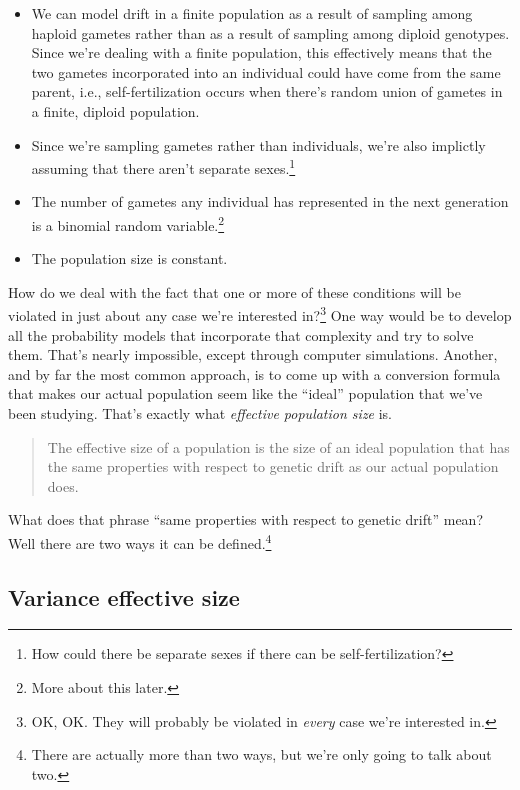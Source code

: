 \begin{itemize}

\item We can model drift in a finite population as a result of
sampling among haploid gametes rather than as a result of sampling
among diploid genotypes. Since we're dealing with a finite population,
this effectively means that the two gametes incorporated into an
individual could have come from the same parent, i.e.,
self-fertilization occurs when there's random union of gametes in a
finite, diploid population.

\item Since we're sampling gametes rather than individuals, we're also
  implictly assuming that there aren't separate sexes.\footnote{How
    could there be separate sexes if there can be self-fertilization?}

\item The number of gametes any individual has represented in the next
  generation is a binomial random variable.\footnote{More about this
    later.}

\item The population size is constant.

\end{itemize}

How do we deal with the fact that one or more of these conditions will
be violated in just about any case we're interested in?\footnote{OK,
  OK. They will probably be violated in {\it every\/} case we're
  interested in.} One way would be to develop all the probability
models that incorporate that complexity and try to solve them. That's
nearly impossible, except through computer simulations. Another, and
by far the most common approach, is to come up with a conversion
formula that makes our actual population seem like the ``ideal''
population that we've been studying. That's exactly what {\it
  effective population size\/} is.
\begin{quote}
The effective size of a population is the size of an ideal population
that has the same properties with respect to genetic drift as our
actual population does.
\end{quote}
What does that phrase ``same properties with respect to genetic
drift'' mean? Well there are two ways it can be
defined.\footnote{There are actually more than two ways, but we're
  only going to talk about two.}

\subsection*{Variance effective size}

